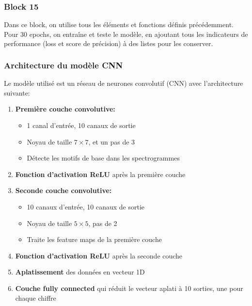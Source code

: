 \documentclass{article}
\begin{document}
\subsubsection{Block 15}
Dans ce block, on utilise tous les éléments et fonctions définis précédemment. Pour 30 epochs, on entraîne et teste le modèle, en ajoutant tous les indicateurs de performance (loss et score de précision) à des listes pour les conserver.

\subsubsection{Architecture du modèle CNN}
\label{subsubsec:architecture}

Le modèle utilisé est un réseau de neurones convolutif (CNN) avec l'architecture suivante:

\begin{enumerate}
    \item \textbf{Première couche convolutive:}
    \begin{itemize}
        \item 1 canal d'entrée, 10 canaux de sortie
        \item Noyau de taille $7 \times 7$, et un pas de 3
        \item Détecte les motifs de base dans les spectrogrammes
    \end{itemize}
    
    \item \textbf{Fonction d'activation ReLU} après la première couche
    
    \item \textbf{Seconde couche convolutive:}
    \begin{itemize}
        \item 10 canaux d'entrée, 10 canaux de sortie
        \item Noyau de taille $5 \times 5$, pas de 2
        \item Traite les feature maps de la première couche
    \end{itemize}
    
    \item \textbf{Fonction d'activation ReLU} après la seconde couche
    
    \item \textbf{Aplatissement} des données en vecteur 1D
    
    \item \textbf{Couche fully connected} qui réduit le vecteur aplati à 10 sorties, une pour chaque chiffre
\end{enumerate}
\end{document}
